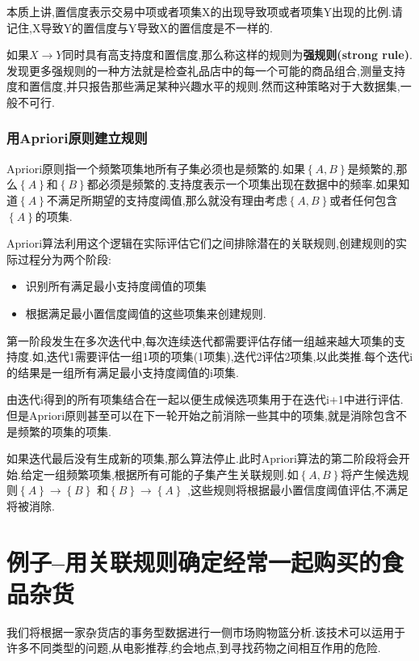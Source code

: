 \documentclass[11pt,a4paper,oneside]{book}
\begin{document}
本质上讲,置信度表示交易中项或者项集X的出现导致项或者项集Y出现的比例.请记住,X导致Y的置信度与Y导致X的置信度是不一样的.

如果$ X\rightarrow Y $同时具有高支持度和置信度,那么称这样的规则为\textbf{强规则(strong rule)}.发现更多强规则的一种方法就是检查礼品店中的每一个可能的商品组合,测量支持度和置信度,并只报告那些满足某种兴趣水平的规则.然而这种策略对于大数据集,一般不可行.

\subsubsection{用Apriori原则建立规则}
Apriori原则指一个频繁项集地所有子集必须也是频繁的.如果$ \left\lbrace A,B\right\rbrace  $是频繁的,那么$ \left\lbrace A\right\rbrace  $和$ \left\lbrace B\right\rbrace  $都必须是频繁的.支持度表示一个项集出现在数据中的频率.如果知道$ \left\lbrace A\right\rbrace  $不满足所期望的支持度阈值,那么就没有理由考虑$ \left\lbrace A,B\right\rbrace  $或者任何包含$ \left\lbrace A\right\rbrace  $的项集.

Apriori算法利用这个逻辑在实际评估它们之间排除潜在的关联规则,创建规则的实际过程分为两个阶段:
\begin{itemize}
	\item 识别所有满足最小支持度阈值的项集
	\item 根据满足最小置信度阈值的这些项集来创建规则.
\end{itemize}
第一阶段发生在多次迭代中,每次连续迭代都需要评估存储一组越来越大项集的支持度.如,迭代1需要评估一组1项的项集(1项集),迭代2评估2项集,以此类推.每个迭代i的结果是一组所有满足最小支持度阈值的i项集.

由迭代i得到的所有项集结合在一起以便生成候选项集用于在迭代i+1中进行评估.但是Apriori原则甚至可以在下一轮开始之前消除一些其中的项集,就是消除包含不是频繁的项集的项集.

如果迭代最后没有生成新的项集,那么算法停止.此时Apriori算法的第二阶段将会开始.给定一组频繁项集,根据所有可能的子集产生关联规则.如$ \left\lbrace A,B\right\rbrace  $将产生候选规则$ \left\lbrace A\right\rbrace \rightarrow \left\lbrace B\right\rbrace  $ 和$ \left\lbrace B\right\rbrace \rightarrow \left\lbrace A\right\rbrace  $ ,这些规则将根据最小置信度阈值评估,不满足将被消除.

\section{例子--用关联规则确定经常一起购买的食品杂货}
我们将根据一家杂货店的事务型数据进行一侧市场购物篮分析.该技术可以运用于许多不同类型的问题,从电影推荐,约会地点,到寻找药物之间相互作用的危险.
\end{document}
